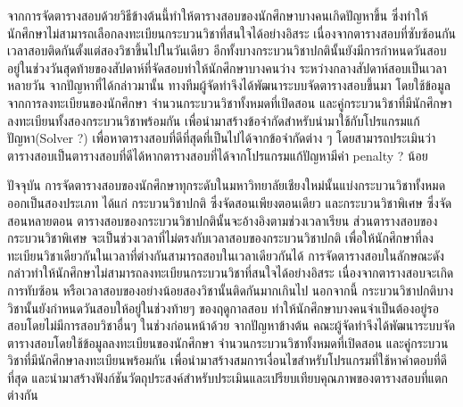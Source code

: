 \maketitle
\makesignature

\ifproject
\begin{abstractTH}
จากการจัดตารางสอบด้วยวิธีข้างต้นนี้ทำให้ตารางสอบของนักศึกษาบางคนเกิดปัญหาขึ้น
ซึ่งทำให้นักศึกษาไม่สามารถเลือกลงทะเบียนกระบวนวิชาที่สนใจได้อย่างอิสระ เนื่องจากตารางสอบที่ซับซ้อนกัน
เวลาสอบติดกันตั้งแต่สองวิชาขึ้นไปในวันเดียว อีกทั้งบางกระบวนวิชาปกตินั้นยังมีการกำหนดวันสอบอยู่ในช่วงวันสุดท้ายของสัปดาห์ที่จัดสอบทำให้นักศึกษาบางคนว่าง
ระหว่างกลางสัปดาห์สอบเป็นเวลาหลายวัน จากปัญหาที่ได้กล่าวมานั้น ทางทีมผู้จัดทำจึงได้พัฒนาระบบจัดตารางสอบขึ้นมา 
โดยใช้ข้อมูลจากการลงทะเบียนของนักศึกษา จำนวนกระบวนวิชาทั้งหมดที่เปิดสอน และคู่กระบวนวิชาที่มีนักศึกษาลงทะเบียนทั้งสองกระบวนวิชาพร้อมกัน 
เพื่อนำมาสร้างข้อจำกัดสำหรับนำมาใช้กับโปรแกรมแก้ปัญหา(Solver ?) เพื่อหาตารางสอบที่ดีที่สุดที่เป็นไปได้จากข้อจำกัดต่าง ๆ 
โดยสามารถประเมินว่าตารางสอบเป็นตารางสอบที่ดีได้หากตารางสอบที่ได้จากโปรแกรมแก้ปัญหามีค่า penalty ? น้อย 

\textcolor{Orange2}{
ปัจจุบัน การจัดตารางสอบของนักศึกษาทุกระดับในมหาวิทยาลัยเชียงใหม่นั้นแบ่งกระบวนวิชาทั้งหมดออกเป็นสองประเภท ได้แก่ กระบวนวิชาปกติ ซึ่งจัดสอนเพียงตอนเดียว และกระบวนวิชาพิเศษ ซึ่งจัดสอนหลายตอน
\enskip
ตารางสอบของกระบวนวิชาปกตินั้นจะอ้างอิงตามช่วงเวลาเรียน
ส่วนตารางสอบของกระบวนวิชาพิเศษ จะเป็นช่วงเวลาที่ไม่ตรงกับเวลาสอบของกระบวนวิชาปกติ เพื่อให้นักศึกษาที่ลงทะเบียนวิชาเดียวกันในเวลาที่ต่างกันสามารถสอบในเวลาเดียวกันได้
\enskip
การจัดตารางสอบในลักษณะดังกล่าวทำให้นักศึกษาไม่สามารถลงทะเบียนกระบวนวิชาที่สนใจได้อย่างอิสระ เนื่องจากตารางสอบจะเกิดการทับซ้อน หรือเวลาสอบของอย่างน้อยสองวิชานั้นติดกันมากเกินไป
\enskip
นอกจากนี้ กระบวนวิชาปกติบางวิชานั้นยังกำหนดวันสอบให้อยู่ในช่วงท้ายๆ ของฤดูกาลสอบ ทำให้นักศึกษาบางคนจำเป็นต้องอยู่รอสอบโดยไม่มีการสอบวิชาอื่นๆ ในช่วงก่อนหน้าด้วย
\enskip
จากปัญหาข้างต้น คณะผู้จัดทำจึงได้พัฒนาระบบจัดตารางสอบโดยใช้ข้อมูลลงทะเบียนของนักศึกษา จำนวนกระบวนวิชาทั้งหมดที่เปิดสอน และคู่กระบวนวิชาที่มีนักศึกษาลงทะเบียนพร้อมกัน
เพื่อนำมาสร้างสมการเงื่อนไขสำหรับโปรแกรมที่ใช้หาคำตอบที่ดีที่สุด และนำมาสร้างฟังก์ชันวัตถุประสงค์สำหรับประเมินและเปรียบเทียบคุณภาพของตารางสอบที่แตกต่างกัน
}
\end{abstractTH}

